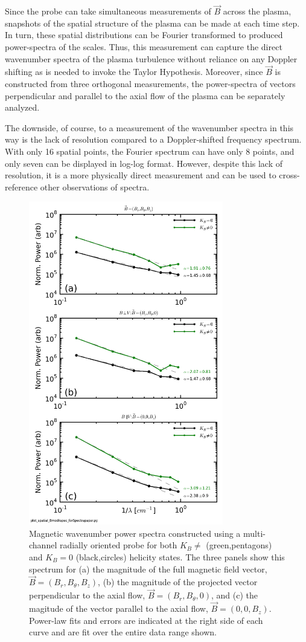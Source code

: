 \documentclass[aip,prl,amsmath,amssymb,reprint,superscriptaddress]{revtex4-1} %
\begin{document}
Since the probe can take simultaneous measurements of $\vec{B}$ across the plasma, snapshots of the spatial structure of the plasma can be made at each time step. In turn, these spatial distributions can be Fourier transformed to produced power-spectra of the scales. Thus, this measurement can capture the direct wavenumber spectra of the plasma turbulence without reliance on any Doppler shifting as is needed to invoke the Taylor Hypothesis. Moreover, since $\vec{B}$ is constructed from three orthogonal measurements, the power-spectra of vectors perpendicular and parallel to the axial flow of the plasma can be separately analyzed. 

The downside, of course, to a measurement of the wavenumber spectra in this way is the lack of resolution compared to a Doppler-shifted frequency spectrum. With only 16 spatial points, the Fourier spectrum can have only 8 points, and only seven can be displayed in log-log format. However, despite this lack of resolution, it is a more physically direct measurement and can be used to cross-reference other observations of spectra.

\begin{figure}[!htbp]
\centerline{
\includegraphics[width=8.5cm]{Bmod_FFTwavenumberspectra_wFits_40t60us}}
\caption{\label{fig:wavenumber_spectra} Magnetic wavenumber power spectra constructed using a multi-channel radially oriented probe for both $K_{B}\neq$ (green,pentagons) and $K_{B}=0$ (black,circles) helicity states. The three panels show this spectrum for (a) the magnitude of the full magnetic field vector, $\vec{B} = (B_{r},B_{\theta},B_{z})$, (b) the magnitude of the projected vector perpendicular to the axial flow, $\vec{B} = (B_{r},B_{\theta},0)$, and (c) the magitude of the vector parallel to the axial flow, $\vec{B} = (0,0,B_{z})$. Power-law fits and errors are indicated at the right side of each curve and are fit over the entire data range shown.}
\end{figure}
\end{document}
